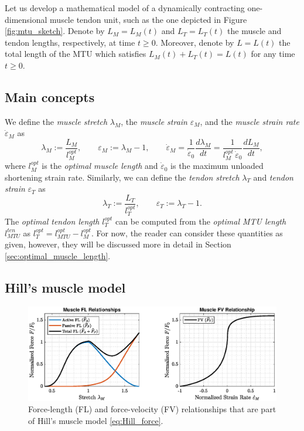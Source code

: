 \documentclass{sfuthesis}
\numberwithin{equation}{section}
\numberwithin{figure}{chapter}
\numberwithin{table}{chapter}
\theoremstyle{definition}
\newcommand{\der}[2]{\dfrac{d #1}{d #2}}
\newcommand{\depsilon}{\dot{\varepsilon}}
\begin{document}
Let us develop a mathematical model of a dynamically contracting one-dimensional muscle tendon unit, such as the one depicted in Figure \ref{fig:mtu_sketch}. Denote by $L_M = L_M(t)$ and $L_T= L_T(t)$ the muscle and tendon lengths, respectively, at time $t \geq 0$. Moreover, denote by $L = L(t)$ the total length of the MTU which satisfies $L_M(t) + L_T(t) = L(t)$ for any time $t \geq 0$.

\subsection{Main concepts}

We define the \textit{muscle stretch} $\lambda_M$, the \textit{muscle strain} $\varepsilon_M$, and the \textit{muscle strain rate} $\depsilon_M$ as
\begin{equation} \label{eq:def_stretch_strain_rate_muscle}
    \lambda_M := \dfrac{L_M}{l_M^{opt}}, \qquad \varepsilon_M := \lambda_M - 1, \qquad \depsilon_M = \dfrac{1}{\depsilon_0} \der{\lambda_M}{t} = \dfrac{1}{l_M^{opt} \, \depsilon_0} \der{L_M}{t},
\end{equation}
where $l_M^{opt}$ is the \textit{optimal muscle length} and $\depsilon_0$ is the maximum unloaded shortening strain rate. Similarly, we can define the \textit{tendon stretch} $\lambda_T$ and \textit{tendon strain} $\varepsilon_T$ as
\begin{equation}
    \lambda_T := \dfrac{L_T}{l_T^{opt}}, \qquad \varepsilon_T := \lambda_T - 1.
\end{equation} 
The \textit{optimal tendon length} $l_T^{opt}$ can be computed from the \textit{optimal MTU length} $l_{MTU}^{ten}$ as  $l_T^{opt} = l_{MTU}^{opt} - l_M^{opt}$. For now, the reader can consider these quantities as given, however, they will be discussed more in detail in Section \ref{sec:optimal_muscle_length}.

\subsection{Hill's muscle model}

\begin{figure}
    \centering
    \includegraphics[width=\textwidth]{plot_FL_FV.eps}
    \caption{Force-length (FL) and force-velocity (FV) relationships that are part of Hill's muscle model \eqref{eq:Hill_force}. \label{fig:plot_FL_FV}}
\end{figure}
\end{document}
